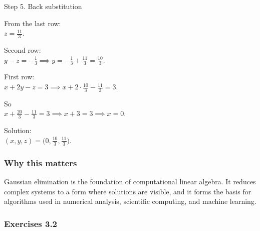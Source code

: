 \documentclass[
  12pt,
  a4paper,
]{article}
\begin{document}
Step 5. Back substitution

From the last row:\\
\(
z = \tfrac{11}{3}.
\)

Second row:\\
\(
y - z = -\tfrac{1}{3} \implies y = -\tfrac{1}{3} + \tfrac{11}{3} = \tfrac{10}{3}.
\)

First row:\\
\(
x + 2y - z = 3 \implies x + 2\cdot\tfrac{10}{3} - \tfrac{11}{3} = 3.
\)

So\\
\(
x + \tfrac{20}{3} - \tfrac{11}{3} = 3 \implies x + 3 = 3 \implies x = 0.
\)

Solution:\\
\(
(x,y,z) = \big(0, \tfrac{10}{3}, \tfrac{11}{3}\big).
\)

\subsubsection{Why this matters}\label{why-this-matters-9}

Gaussian elimination is the foundation of computational linear algebra.
It reduces complex systems to a form where solutions are visible, and it
forms the basis for algorithms used in numerical analysis, scientific
computing, and machine learning.

\subsubsection{Exercises 3.2}\label{exercises-32}
\end{document}
